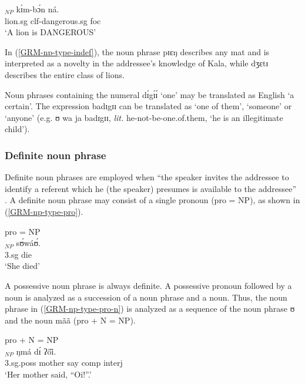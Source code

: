 \begin{exe}
\begin{exe}
\begin{exe}
{\ex\label{GRM-np-indef-2}
\gll  [dʒɛ̀tɪ̀]$_{NP}$ kɪ̀m-bɔ́n  ná.\\
  {lion.{\sc sg}} {\sc clf}-dangerous.{\sc sg} {\sc foc}\\
\glt  `A lion is DANGEROUS'



\z 
 \z

In (\ref{GRM-np-type-indef}),  the noun phrase {\sls  pɪɛŋ}  describes any mat
and
is interpreted as a novelty in the addressee's knowledge of Kala, while
{\sls dʒɛtɪ} describes the entire class of lions. 

Noun phrases  containing the
numeral {\sls dɪ́gɪ́ɪ́} `one'  may be translated as
English `a certain'. The
expression {\sls badɪgɪɪ} can be translated as `one of them', `someone' or
`anyone'  (e.g. {\sls ʊ wa ja badɪgɪɪ}, {\it lit.} he-not-be-one.of.them, `he is
an
illegitimate child'). 



\subsubsection{Definite noun phrase}
\label{sec:GRM-np-def}

Definite noun phrases are employed when ``the speaker invites the addressee to
identify a referent which he (the speaker) presumes is available to the
addressee'' \citep[184]{Dik97}. A definite noun phrase may consist of  a single
pronoun (pro = NP), as
shown in (\ref{GRM-np-type-pro}).

\begin{exe}
 \ex\label{GRM-np-type-pro}{\rm pro = NP}\\
\gll  [ʊ̀]$_{NP}$  sʊ́wáʊ́.\\
   {\sc 3.sg} die\\
\glt  `She died'
\z


A possessive noun phrase is always definite. A possessive pronoun followed by a
noun is analyzed as a succession of a noun phrase and a noun. Thus,  the noun
phrase in (\ref{GRM-np-type-pro-n})  is analyzed as a sequence of the noun
phrase {\sls ʊ} and the  noun  {\sls mãã} (pro + N = NP). 


\begin{exe}

 \ex\label{GRM-np-type-pro-n}{\rm pro + N = NP}\\
\gll   [ʊ̀ mã̀ã̀]$_{NP}$ ŋmá dɪ́ ʔői̋.\\
   {\sc 3.sg.poss} mother say  {\sc comp} {\sc interj}\\
\glt  `Her mother said, ``Oi!''.'
\z



\end{exe}
\end{exe}}
\end{exe}
\end{exe}
\end{exe}
